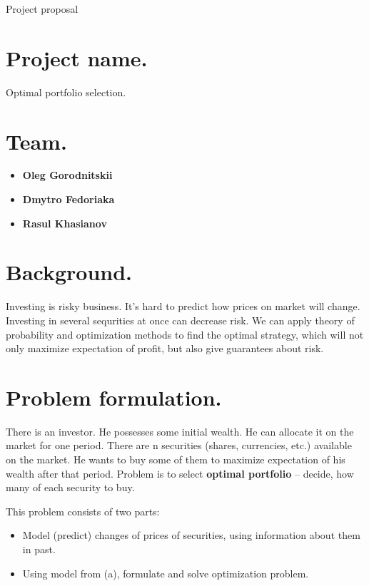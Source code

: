 \documentclass[a4paper, 12pt]{article}
\author{Dmytro Fedoriaka, Oleg Gorodnitskii}
\begin{document}
\begin{center}

{\Large Project proposal}
 
 
\end{center}

\bigskip
 


\section{Project name.} 

Optimal portfolio selection.

\section{Team.}

\begin{itemize}
  \item{\textbf{Oleg Gorodnitskii}}
	\item{\textbf{Dmytro Fedoriaka}}
	\item{\textbf{Rasul Khasianov}}
\end{itemize}

\section{Background.}

Investing is risky business. It's hard to predict how prices on market will change. Investing in several sequrities at once
can decrease risk. We can apply theory of probability and optimization methods to find the optimal strategy, which will
not only maximize expectation of profit, but also give guarantees about risk.

\section{Problem formulation.}

There is an investor. He possesses some initial wealth.
He can allocate it on the market for one period. There are n securities (shares, currencies, etc.) available on the market. He wants to buy some of them to maximize expectation of his wealth after that period. 
Problem is to select \textbf{optimal portfolio} – decide, how many of each security to buy.

This problem consists of two parts:
\begin{itemize}
\item{Model (predict) changes of prices of securities, using information about them in past.}
\item{Using model from (a), formulate and solve optimization problem.}
\end{itemize}
\end{document}
